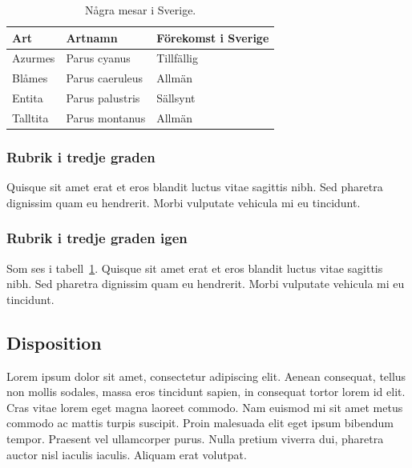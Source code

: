 \documentclass[11pt,a4paper]{article}
\begin{document}
\begin{table}[hbt]
  \begin{center}
    \caption{Några mesar i Sverige.}
    \label{mesar}
    \begin{tabular}{|l|l|l|}
      \hline
      Art      & Artnamn         & Förekomst i Sverige \\
      \hline
      Azurmes  & Parus cyanus    & Tillfällig \\
      \hline
      Blåmes   & Parus caeruleus & Allmän \\
      \hline
      Entita   & Parus palustris & Sällsynt \\ 
      \hline
      Talltita & Parus montanus  & Allmän \\
      \hline
    \end{tabular}
  \end{center}
\end{table}

\subsubsection*{Rubrik i tredje graden}
Quisque sit amet erat et eros blandit luctus vitae sagittis
nibh. Sed pharetra dignissim quam eu hendrerit. Morbi vulputate
vehicula mi eu tincidunt.

\subsubsection*{Rubrik i tredje graden igen}
Som ses i tabell~\ref{mesar}. Quisque sit amet erat et eros blandit
luctus vitae sagittis nibh. Sed pharetra dignissim quam eu
hendrerit. Morbi vulputate vehicula mi eu tincidunt.

\subsection{Disposition}
Lorem ipsum dolor sit amet, consectetur adipiscing elit. Aenean
consequat, tellus non mollis sodales, massa eros tincidunt sapien, in
consequat tortor lorem id elit. Cras vitae lorem eget magna laoreet
commodo. Nam euismod mi sit amet metus commodo ac mattis turpis
suscipit. Proin malesuada elit eget ipsum bibendum tempor. Praesent
vel ullamcorper purus. Nulla pretium viverra dui, pharetra auctor nisl
iaculis iaculis. Aliquam erat volutpat.
\end{document}
